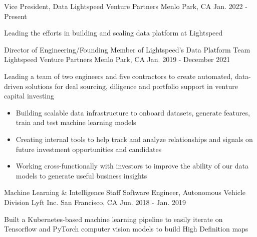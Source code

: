

\begin{cventries}

  \cventry
  {Vice President, Data} %
  {Lightspeed Venture Partners} %
  {Menlo Park, CA} %
  {Jan. 2022 - Present} %
  {
    \begin{cvitems} %
      \item{Leading the efforts in building and scaling data platform at Lightspeed}
    \end{cvitems}
  }

  \cventry
  {Director of Engineering/Founding Member of Lightspeed's Data Platform Team} %
  {Lightspeed Venture Partners} %
  {Menlo Park, CA} %
  {Jan. 2019 - December 2021} %
  {
    \begin{cvitems} %
      \item{Leading a team of two engineers and five contractors to create automated, data-driven solutions for deal sourcing, diligence and portfolio support in venture capital investing}
      \begin{itemize}[label=$\circ$]
        \item{Building scalable data infrastructure to onboard datasets, generate features, train and test machine learning models}
        \item{Creating internal tools to help track and analyze relationships and signals on future investment opportunities and candidates}
        \item{Working cross-functionally with investors to improve the ability of our data models to generate useful business insights}
      \end{itemize}
    \end{cvitems}
  }

  \cventry
  {Machine Learning \& Intelligence Staff Software Engineer, Autonomous Vehicle Division} %
  {Lyft Inc.} %
  {San Francisco, CA} %
  {Jun. 2018 - Jan. 2019} %
  {
    \begin{cvitems} %
      \item{Built a Kubernetes-based machine learning pipeline to easily iterate on Tensorflow and PyTorch computer vision models to build High Definition maps}
    \end{cvitems}
  }


\end{cventries}
